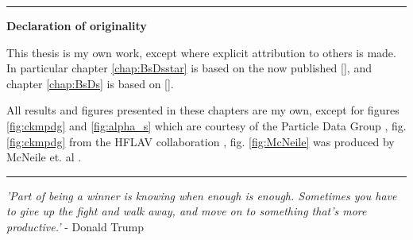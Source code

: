 \begin{titlepage}
\begin{vcenterpage}
\noindent\rule[2pt]{\textwidth}{0.5pt}
\begin{center}
{\large\textbf{Declaration of originality}}
\end{center}
This thesis is my own work, except where explicit attribution to others is made. In particular chapter \ref{chap:BsDsstar} is based on the now published [{}], and chapter \ref{chap:BsDs} is based on [{}].

All results and figures presented in these chapters are my own, except for figures \ref{fig:ckmpdg} and \ref{fig:alpha_s} which are courtesy of the Particle Data Group \cite{PhysRevD.98.030001}, fig. \ref{fig:ckmpdg} from the HFLAV collaboration \cite{HFLAV16}, fig. \ref{fig:McNeile} was produced by McNeile et. al \cite{McNeile:2012qf} .
    
\noindent\rule[2pt]{\textwidth}{0.5pt}
\end{vcenterpage}

\cleardoublepage

\thispagestyle{empty}

\begin{center}
  \emph{'Part of being a winner is knowing when enough is enough. Sometimes you have to give up the fight and walk away, and move on to something that's more productive.'} - Donald Trump
\end{center}

{}


\end{titlepage}
\sloppy

\titlepage
